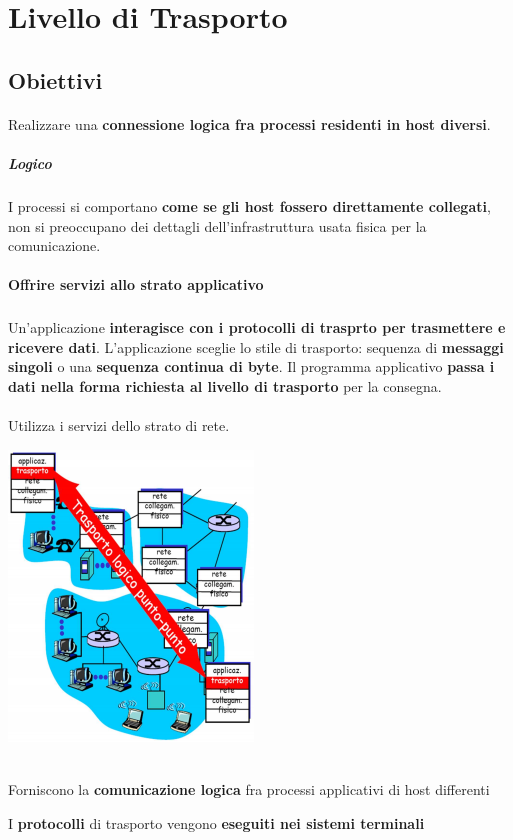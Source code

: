 \documentclass[10pt]{article}
\begin{document}
\section{Livello di Trasporto}
\subsection{Obiettivi}
\paragraph{}Realizzare una \textbf{connessione logica fra processi residenti in host diversi}.
\subparagraph{Logico} I processi si comportano \textbf{come se gli host fossero direttamente collegati}, non si preoccupano dei dettagli dell'infrastruttura usata fisica per la comunicazione.
\paragraph{}\textbf{Offrire servizi allo strato applicativo}
\subparagraph{} Un'applicazione \textbf{interagisce con i protocolli di trasprto per trasmettere e ricevere dati}. L'applicazione sceglie lo stile di trasporto: sequenza di \textbf{messaggi singoli} o una \textbf{sequenza continua di byte}. Il programma applicativo \textbf{passa i dati nella forma richiesta al livello di trasporto} per la consegna.
\paragraph{} Utilizza i servizi dello strato di rete.
\begin{multicols}{2}
\includegraphics[scale=0.9]{livtrasporto.png}\\\\
\columnbreak


\begin{list}{}{I servizi di trasporto:}
\item Forniscono la \textbf{comunicazione logica} fra processi applicativi di host differenti
\item I \textbf{protocolli} di trasporto vengono \textbf{eseguiti nei sistemi terminali}
\end{list}
\end{multicols}
\end{document}
